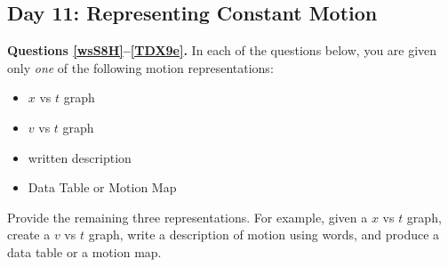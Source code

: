 \documentclass[dvipsnames]{exam}
\begin{document}
\begin{questions}
\question
\phantom{.}

\begin{center}
\end{center}

\subsection*{Day 11: Representing Constant Motion}

\begin{EnvUplevel}
    \textbf{Questions \ref{wsS8H}--\ref{TDX9e}.} In each of the questions below, you are given only \textit{one} of the following motion representations:

    \begin{itemize}
        \item $x$ vs $t$ graph
        \item $v$ vs $t$ graph
        \item written description
        \item Data Table or Motion Map
    \end{itemize}

    Provide the remaining three representations. For example, given a $x$ vs $t$ graph, create a $v$ vs $t$ graph, write a description of motion using words, and produce a data table or a motion map.
\end{EnvUplevel}

\question \label{wsS8H}
\phantom{.}

\begin{center}
\end{center}


\end{questions}
\end{document}
